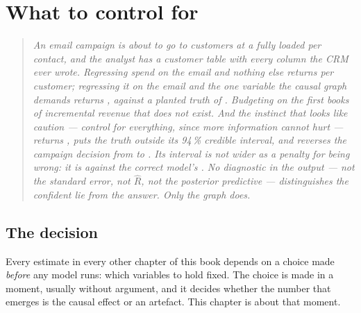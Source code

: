 %
\chapter{What to control for}
\label{ch:ctrl}

\begin{quote}\small
\emph{An email campaign is about to go to \nbFiveCampaignN{} customers at a fully loaded
\eur{\nbFiveCost} per contact, and the analyst has a customer table with every column the CRM
ever wrote. Regressing spend on the email and nothing else returns \eur{\nbFiveNaiveEst} per
customer; regressing it on the email and the one variable the causal graph demands returns
\eur{\nbFiveAdjEst}, against a planted truth of \eur{\nbFiveTrueAte}. Budgeting on the first
books \eur{\nbFivePhantom} of incremental revenue that does not exist. And the instinct that
looks like caution --- control for everything, since more information cannot hurt --- returns
\eur{\nbFiveKsBayesEst}, puts the truth outside its 94\,\% credible interval, and reverses the
campaign decision from \nbFiveDecision{} to \nbFiveDecisionKs. Its interval is not wider as a
penalty for being wrong: it is \eur{\nbFiveKsBayesWidth} against the correct model's
\eur{\nbFiveBayesWidth}. No diagnostic in the output --- not the standard error, not $\hat R$,
not the posterior predictive --- distinguishes the confident lie from the answer. Only the
graph does.}
\end{quote}

\section{The decision}
\label{sec:ctrl:decision}

Every estimate in every other chapter of this book depends on a choice made \emph{before} any
model runs: which variables to hold fixed. The choice is made in a moment, usually without
argument, and it decides whether the number that emerges is the causal effect or an artefact.
This chapter is about that moment.

